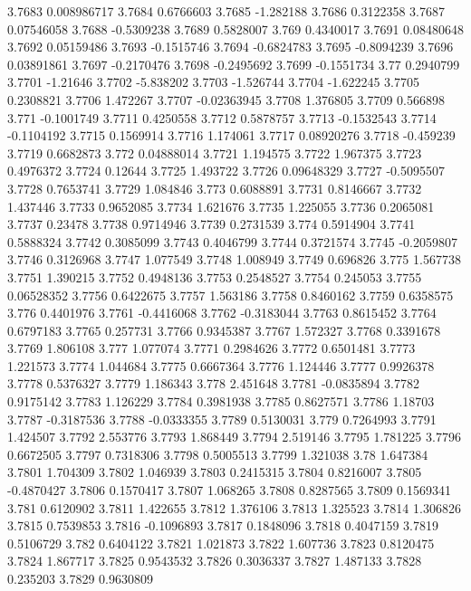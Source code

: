 3.7683  0.008986717
3.7684  0.6766603
3.7685  -1.282188
3.7686  0.3122358
3.7687  0.07546058
3.7688  -0.5309238
3.7689  0.5828007
3.769  0.4340017
3.7691  0.08480648
3.7692  0.05159486
3.7693  -0.1515746
3.7694  -0.6824783
3.7695  -0.8094239
3.7696  0.03891861
3.7697  -0.2170476
3.7698  -0.2495692
3.7699  -0.1551734
3.77  0.2940799
3.7701  -1.21646
3.7702  -5.838202
3.7703  -1.526744
3.7704  -1.622245
3.7705  0.2308821
3.7706  1.472267
3.7707  -0.02363945
3.7708  1.376805
3.7709  0.566898
3.771  -0.1001749
3.7711  0.4250558
3.7712  0.5878757
3.7713  -0.1532543
3.7714  -0.1104192
3.7715  0.1569914
3.7716  1.174061
3.7717  0.08920276
3.7718  -0.459239
3.7719  0.6682873
3.772  0.04888014
3.7721  1.194575
3.7722  1.967375
3.7723  0.4976372
3.7724  0.12644
3.7725  1.493722
3.7726  0.09648329
3.7727  -0.5095507
3.7728  0.7653741
3.7729  1.084846
3.773  0.6088891
3.7731  0.8146667
3.7732  1.437446
3.7733  0.9652085
3.7734  1.621676
3.7735  1.225055
3.7736  0.2065081
3.7737  0.23478
3.7738  0.9714946
3.7739  0.2731539
3.774  0.5914904
3.7741  0.5888324
3.7742  0.3085099
3.7743  0.4046799
3.7744  0.3721574
3.7745  -0.2059807
3.7746  0.3126968
3.7747  1.077549
3.7748  1.008949
3.7749  0.696826
3.775  1.567738
3.7751  1.390215
3.7752  0.4948136
3.7753  0.2548527
3.7754  0.245053
3.7755  0.06528352
3.7756  0.6422675
3.7757  1.563186
3.7758  0.8460162
3.7759  0.6358575
3.776  0.4401976
3.7761  -0.4416068
3.7762  -0.3183044
3.7763  0.8615452
3.7764  0.6797183
3.7765  0.257731
3.7766  0.9345387
3.7767  1.572327
3.7768  0.3391678
3.7769  1.806108
3.777  1.077074
3.7771  0.2984626
3.7772  0.6501481
3.7773  1.221573
3.7774  1.044684
3.7775  0.6667364
3.7776  1.124446
3.7777  0.9926378
3.7778  0.5376327
3.7779  1.186343
3.778  2.451648
3.7781  -0.0835894
3.7782  0.9175142
3.7783  1.126229
3.7784  0.3981938
3.7785  0.8627571
3.7786  1.18703
3.7787  -0.3187536
3.7788  -0.0333355
3.7789  0.5130031
3.779  0.7264993
3.7791  1.424507
3.7792  2.553776
3.7793  1.868449
3.7794  2.519146
3.7795  1.781225
3.7796  0.6672505
3.7797  0.7318306
3.7798  0.5005513
3.7799  1.321038
3.78  1.647384
3.7801  1.704309
3.7802  1.046939
3.7803  0.2415315
3.7804  0.8216007
3.7805  -0.4870427
3.7806  0.1570417
3.7807  1.068265
3.7808  0.8287565
3.7809  0.1569341
3.781  0.6120902
3.7811  1.422655
3.7812  1.376106
3.7813  1.325523
3.7814  1.306826
3.7815  0.7539853
3.7816  -0.1096893
3.7817  0.1848096
3.7818  0.4047159
3.7819  0.5106729
3.782  0.6404122
3.7821  1.021873
3.7822  1.607736
3.7823  0.8120475
3.7824  1.867717
3.7825  0.9543532
3.7826  0.3036337
3.7827  1.487133
3.7828  0.235203
3.7829  0.9630809
